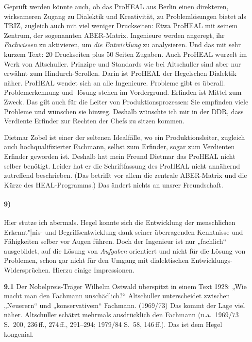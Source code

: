 \documentclass[12pt,a4paper]{article}
\begin{document}
Geprüft werden könnte auch, ob das ProHEAL aus Berlin einen direkteren,
wirksameren Zugang zu Dialektik und Kreativität, zu Problemlösungen bietet als
TRIZ, zugleich auch mit viel weniger Druckseiten: Etwa ProHEAL mit seinem
Zentrum, der sogenannten ABER-Matrix. Ingenieure werden angeregt, ihr
\emph{Fachwissen} zu aktivieren, um \emph{die Entwicklung} zu analysieren. Und
das mit sehr kurzem Text: 20 Druckseiten plus 50 Seiten Zugaben. Auch ProHEAL
wurzelt im Werk von Altschuller. Prinzipe und Standards wie bei Altschuller
sind aber nur erwähnt zum Hindurch-Scrollen. Darin ist ProHEAL der Hegelschen
Dialektik näher. ProHEAL wendet sich an alle Ingenieure. Probleme gibt es
überall. Problemerkennung und -lösung stehen im Vordergrund. Erfinden ist
Mittel zum Zweck. Das gilt auch für die Leiter von Produktionsprozessen: Sie
empfinden viele Probleme und wünschen sie hinweg. Deshalb wünschte ich mir in
der DDR, dass Verdiente Erfinder zur Rechten der Chefs zu sitzen kommen.

Dietmar Zobel ist einer der seltenen Idealfälle, wo ein Produktionsleiter,
zugleich auch hochqualifizierter Fachmann, selbst zum Erfinder, sogar zum
Verdienten Erfinder geworden ist. Deshalb hat mein Freund Dietmar das ProHEAL
nicht selber benötigt. Leider hat er die Schriftfassung des ProHEAL nicht
annähernd zutreffend beschrieben. (Das betrifft vor allem die zentrale
ABER-Matrix und die Kürze des HEAL-Programms.) Das ändert nichts an unsrer
Freundschaft. 

\paragraph{9)} 
Hier stutze ich abermals. Hegel konnte sich die Entwicklung der menschlichen
Erkennt"|nis- und Begriffsentwicklung dank seiner überragenden Kenntnisse und
Fähigkeiten selber vor Augen führen. Doch der Ingenieur ist nur „fachlich“
ausgebildet, auf die Lösung von \emph{Aufgaben} orientiert und nicht für die
Lösung von Problemen, schon gar nicht für den Umgang mit dialektischen
Entwicklungs-Widersprüchen. Hierzu einige Impressionen.

\textbf{9.1} Der Nobelpreis-Träger Wilhelm Ostwald überspitzt in einem Text
1928: „Wie macht man den Fachmann unschädlich?“ Altschuller unterscheidet
zwischen „Neuerern“ und „konservativem“ Fachmann. (1969/73) Das kommt der Lage
viel näher. Altschuller schätzt mehrmals ausdrücklich den Fachmann
(u.a.\ 1969/73 S.~200, 236\,ff., 274\,ff., 291–294; 1979/84 S.~58, 146\,ff.).
Das ist dem Hegel kongenial.
\end{document}
